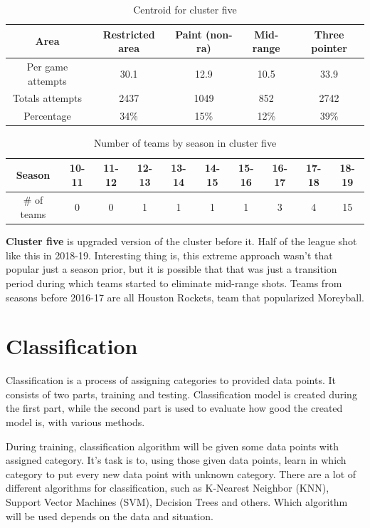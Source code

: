 \documentclass[a4paper]{article}
\begin{document}
\begin{table}[!h]
\begin{center}
\begin{tabular}{|c|c|c|c|c|} \hline
Area & Restricted area & Paint (non-ra) & Mid-range & Three pointer \\ \hline
Per game attempts & 30.1 & 12.9 & 10.5 & 33.9  \\ \hline
Totals attempts & 2437 & 1049 & 852 & 2742 \\ \hline
Percentage & 34\% & 15\% & 12\% & 39\% \\ \hline
\end{tabular}
\caption{Centroid for cluster five}
\label{tab:clust_shooting_by_teams_centr5}
\end{center}
\end{table}

\begin{table}[!h]
\begin{tabular}{|c|c|c|c|c|c|c|c|c|c|} \hline
Season & 10-11 & 11-12 & 12-13 & 13-14 & 14-15 & 15-16 & 16-17 & 17-18 & 18-19 \\ \hline
\# of teams & 0 & 0 & 1 & 1 & 1 & 1 & 3 & 4 & 15 \\ \hline
\end{tabular}
\caption{Number of teams by season in cluster five}
\label{tab:clust_shooting_by_teams_num5}
\end{table}

\textbf{Cluster five} is upgraded version of the cluster before it. Half of the league shot like this in 2018-19. Interesting thing is, this extreme approach wasn't that popular just a season prior, but it is possible that that was just a transition period during which teams started to eliminate mid-range shots. Teams from seasons before 2016-17 are all Houston Rockets, team that popularized Moreyball. 

\section{Classification}
\label{sec:cls}

Classification is a process of assigning categories to provided data points. It consists of two parts, training and testing. Classification model is created during the first part, while the second part is used to evaluate how good the created model is, with various methods.

During training, classification algorithm will be given some data points with assigned category. It's task is to, using those given data points, learn in which category to put every new data point with unknown category. There are a lot of different algorithms for classification, such as K-Nearest Neighbor (KNN), Support Vector Machines (SVM), Decision Trees and others. Which algorithm will be used depends on the data and situation. \cite{supervisedLearning}
\end{document}
